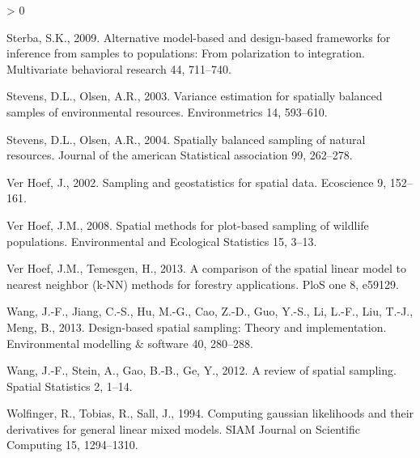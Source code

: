 \documentclass[]{elsarticle} %
\newlength{\cslhangindent}
\newenvironment{CSLReferences}[2] %
 {%
  \setlength{\parindent}{0pt}
  \ifodd #1 \everypar{\setlength{\hangindent}{\cslhangindent}}\ignorespaces\fi
  \ifnum #2 > 0
  \setlength{\parskip}{#2\baselineskip}
  \fi
 }%
 {}
\begin{document}
\begin{CSLReferences}{1}{0}
\leavevmode\hypertarget{ref-sterba2009alternative}{}%
Sterba, S.K., 2009. Alternative model-based and design-based frameworks
for inference from samples to populations: From polarization to
integration. Multivariate behavioral research 44, 711--740.

\leavevmode\hypertarget{ref-stevens2003variance}{}%
Stevens, D.L., Olsen, A.R., 2003. Variance estimation for spatially
balanced samples of environmental resources. Environmetrics 14,
593--610.

\leavevmode\hypertarget{ref-stevens2004spatially}{}%
Stevens, D.L., Olsen, A.R., 2004. Spatially balanced sampling of natural
resources. Journal of the american Statistical association 99, 262--278.

\leavevmode\hypertarget{ref-verhoef2002sampling}{}%
Ver Hoef, J., 2002. Sampling and geostatistics for spatial data.
Ecoscience 9, 152--161.

\leavevmode\hypertarget{ref-verhoef2008spatial}{}%
Ver Hoef, J.M., 2008. Spatial methods for plot-based sampling of
wildlife populations. Environmental and Ecological Statistics 15, 3--13.

\leavevmode\hypertarget{ref-ver2013comparison}{}%
Ver Hoef, J.M., Temesgen, H., 2013. A comparison of the spatial linear
model to nearest neighbor (k-NN) methods for forestry applications. PloS
one 8, e59129.

\leavevmode\hypertarget{ref-wang2013design}{}%
Wang, J.-F., Jiang, C.-S., Hu, M.-G., Cao, Z.-D., Guo, Y.-S., Li, L.-F.,
Liu, T.-J., Meng, B., 2013. Design-based spatial sampling: Theory and
implementation. Environmental modelling \& software 40, 280--288.

\leavevmode\hypertarget{ref-wang2012review}{}%
Wang, J.-F., Stein, A., Gao, B.-B., Ge, Y., 2012. A review of spatial
sampling. Spatial Statistics 2, 1--14.

\leavevmode\hypertarget{ref-wolfinger1994computing}{}%
Wolfinger, R., Tobias, R., Sall, J., 1994. Computing gaussian
likelihoods and their derivatives for general linear mixed models. SIAM
Journal on Scientific Computing 15, 1294--1310.

\end{CSLReferences}
\end{document}
